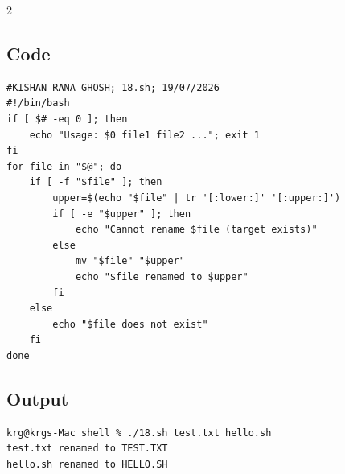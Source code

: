 \documentclass[a4paper,12pt]{article}
\begin{document}
\begin{multicols}{2}
\subsection*{Code}
\begin{lstlisting}[style=bashstyle]
#KISHAN RANA GHOSH; 18.sh; 19/07/2026
#!/bin/bash
if [ $# -eq 0 ]; then
    echo "Usage: $0 file1 file2 ..."; exit 1
fi
for file in "$@"; do
    if [ -f "$file" ]; then
        upper=$(echo "$file" | tr '[:lower:]' '[:upper:]')
        if [ -e "$upper" ]; then
            echo "Cannot rename $file (target exists)"
        else
            mv "$file" "$upper"
            echo "$file renamed to $upper"
        fi
    else
        echo "$file does not exist"
    fi
done
\end{lstlisting}

\subsection*{Output}
\begin{lstlisting}[style=outputstyle]
krg@krgs-Mac shell % ./18.sh test.txt hello.sh
test.txt renamed to TEST.TXT
hello.sh renamed to HELLO.SH
\end{lstlisting}

\end{multicols}
\newpage
\end{document}
